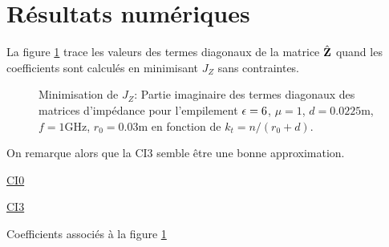 \section{Résultats numériques}

  La figure \ref{fig:imp_fourier:sphere:hoppe:62:hoibc:mode_2} trace les valeurs des termes diagonaux de la matrice \(\hat{\mathbf{Z}}\) quand les coefficients sont calculés en minimisant \(J_Z\) sans contraintes.
  \begin{figure}[!hbt]
    \centering
    
    \caption[CIOE sur empilement de Hoppe Rahmat-Samii p.~62]{Minimisation de \(J_Z\): Partie imaginaire des termes diagonaux des matrices d'impédance pour l'empilement \(\epsilon = 6\), \(\mu = 1\), \(d=0.0225\text{m}\), \(f=1\text{GHz}\), \(r_0=0.03\text{m}\) en fonction de \(k_t = n / (r_0+d)\).}
    \label{fig:imp_fourier:sphere:hoppe:62:hoibc:mode_2}
  \end{figure}
  On remarque alors que la CI3 semble être une bonne approximation. 

  \begin{table}[!hbt]
    \centering
    \begin{minipage}[t]{0.49\textwidth}
      \vspace{0pt}
      \centering
      \begin{coefftable}{\hyperlink{ci0}{CI0}}
        
      \end{coefftable}
    \end{minipage}
    \begin{minipage}[t]{0.49\textwidth}
      \vspace{0pt}
      \centering
      \begin{coefftable}{\hyperlink{ci3}{CI3}}
        
      \end{coefftable}
    \end{minipage}
    \caption{Coefficients associés à la figure \ref{fig:imp_fourier:sphere:hoppe:62:hoibc:mode_2}}
    \label{tab:imp_fourier:sphere:hoppe:62:hoibc:mode_2}
  \end{table}


